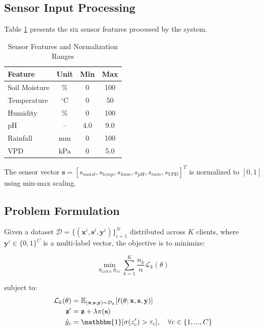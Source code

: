 \documentclass[10pt,journal,compsoc]{IEEEtran}
\begin{document}
\subsection{Sensor Input Processing}

Table \ref{tab:sensor_features} presents the six sensor features processed by the system.

\begin{table}[!t]
\centering
\caption{Sensor Features and Normalization Ranges}
\label{tab:sensor_features}
\small
\begin{tabular}{lccc}
\toprule
\textbf{Feature} & \textbf{Unit} & \textbf{Min} & \textbf{Max} \\
\midrule
Soil Moisture & \% & 0 & 100 \\
Temperature & $^\circ$C & 0 & 50 \\
Humidity & \% & 0 & 100 \\
pH & -- & 4.0 & 9.0 \\
Rainfall & mm & 0 & 100 \\
VPD & kPa & 0 & 5.0 \\
\bottomrule
\end{tabular}
\end{table}

The sensor vector $\mathbf{s} = [s_{moist}, s_{temp}, s_{hum}, s_{pH}, s_{rain}, s_{VPD}]^T$ is normalized to $[0, 1]$ using min-max scaling.

\subsection{Problem Formulation}

Given a dataset $\mathcal{D} = \{(\mathbf{x}^i, \mathbf{s}^i, \mathbf{y}^i)\}_{i=1}^N$ distributed across $K$ clients, where $\mathbf{y}^i \in \{0, 1\}^C$ is a multi-label vector, the objective is to minimize:

\begin{equation}
    \min_{\theta_{LoRA}, \theta_{cls}} \sum_{k=1}^{K} \frac{n_k}{n} \mathcal{L}_k(\theta)
\end{equation}

subject to:
\begin{align}
    \mathcal{L}_k(\theta) &= \mathbb{E}_{(\mathbf{x}, \mathbf{s}, \mathbf{y}) \sim \mathcal{D}_k}[\ell(\theta; \mathbf{x}, \mathbf{s}, \mathbf{y})] \\
    \mathbf{z}' &= \mathbf{z} + \lambda\pi(\mathbf{s}) \\
    \hat{y}_c &= \mathbbm{1}[\sigma(z'_c) > \tau_c], \quad \forall c \in \{1, ..., C\}
\end{align}
\end{document}
